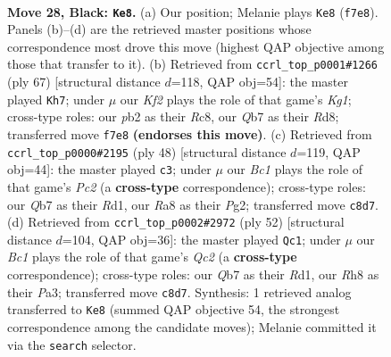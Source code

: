 \documentclass[11pt]{article}
\begin{document}
\begin{figure}[p]
\label{fig:thought-m53}
\end{figure}

\clearpage

\begin{figure}[p]\centering
\begin{subfigure}{0.46\textwidth}\centering
\resizebox{\linewidth}{!}{%
\newchessgame
\chessboard[
  setfen={r1b4r/1q3kbp/p1npp1p1/4p1P1/1p2PnQP/5P1B/PPPKNB2/R1R5 b - - 1 28},
  showmover=false,
  pgfstyle=straightmove, color=movearrow, markmove={f7-e8}
]}
\caption{}
\end{subfigure}\hfill
\begin{subfigure}{0.46\textwidth}\centering
\resizebox{\linewidth}{!}{%
\newchessgame
\chessboard[
  setfen={2rrb1k1/1p2qpn1/p2pp3/P3n2p/1PP1PQ2/N1NB3P/3R2P1/3R2K1 b - - 0 34},
  showmover=false,
  pgfstyle=straightmove, color=movearrow, markmove={g8-h7}
]}
\caption{}
\end{subfigure}
\\[4pt]
\begin{subfigure}{0.46\textwidth}\centering
\resizebox{\linewidth}{!}{%
\newchessgame
\chessboard[
  setfen={knr4r/1p1b2p1/pq2pp1p/2bpP2P/3N1P2/1P2B1QR/P1P1B1P1/1K1R4 w - - 5 25},
  showmover=false,
  pgfstyle=straightmove, color=movearrow, markmove={c2-c3}
]}
\caption{}
\end{subfigure}\hfill
\begin{subfigure}{0.46\textwidth}\centering
\resizebox{\linewidth}{!}{%
\newchessgame
\chessboard[
  setfen={2brr1k1/1p1n1p2/p1pp1qp1/7p/2PNP3/PP2RB1P/2Q2PP1/3R2K1 w - - 3 27},
  showmover=false,
  pgfstyle=straightmove, color=movearrow, markmove={c2-c1}
]}
\caption{}
\end{subfigure}
\caption{\textbf{Move 28, Black: \texttt{Ke8}.} (a) Our position; Melanie plays \texttt{Ke8} (\texttt{f7e8}). Panels (b)--(d) are the retrieved master positions whose correspondence most drove this move (highest QAP objective among those that transfer to it). (b) Retrieved from \texttt{ccrl\_top\_p0001\#1266} (ply 67) [structural distance $d$=118, QAP obj=54]: the master played \texttt{Kh7}; under $\mu$ our \emph{Kf2} plays the role of that game's \emph{Kg1}; cross-type roles: our \emph{p}b2 as their \emph{R}c8, our \emph{Q}b7 as their \emph{R}d8; transferred move \texttt{f7e8} \textbf{(endorses this move)}. (c) Retrieved from \texttt{ccrl\_top\_p0000\#2195} (ply 48) [structural distance $d$=119, QAP obj=44]: the master played \texttt{c3}; under $\mu$ our \emph{Bc1} plays the role of that game's \emph{Pc2} (a \textbf{cross-type} correspondence); cross-type roles: our \emph{Q}b7 as their \emph{R}d1, our \emph{R}a8 as their \emph{P}g2; transferred move \texttt{c8d7}. (d) Retrieved from \texttt{ccrl\_top\_p0002\#2972} (ply 52) [structural distance $d$=104, QAP obj=36]: the master played \texttt{Qc1}; under $\mu$ our \emph{Bc1} plays the role of that game's \emph{Qc2} (a \textbf{cross-type} correspondence); cross-type roles: our \emph{Q}b7 as their \emph{R}d1, our \emph{R}h8 as their \emph{P}a3; transferred move \texttt{c8d7}. Synthesis: 1 retrieved analog transferred to \texttt{Ke8} (summed QAP objective 54, the strongest correspondence among the candidate moves); Melanie committed it via the \texttt{search} selector.}

\end{figure}
\end{document}
